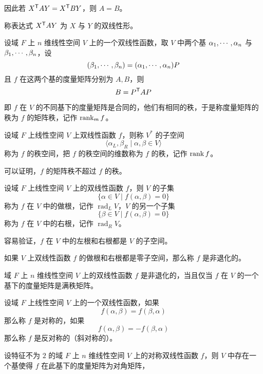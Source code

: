 因此若 ${X}^\mathsf{T}AY = {X}^\mathsf{T}BY$，则 $A = B$。

称表达式 ${X}^\mathsf{T}AY$ 为 $X$ 与 $Y$ 的双线性形。

\begin{theorem}
	设域 $F$ 上 $n$ 维线性空间 $V$ 上的一个双线性函数，取 $V$ 中两个基 $\alpha_1,\cdots,\alpha_n$ 与 $\beta_1,\cdots,\beta_n$，设
	\[ (\beta_1,\cdots,\beta_n) = (\alpha_1,\cdots,\alpha_n)P \]
	且 $f$ 在这两个基的度量矩阵分别为 $A,B$，则
	\[ B = {P}^\mathsf{T}AP \]
\end{theorem}

即 $f$ 在 $V$ 的不同基下的度量矩阵是合同的，他们有相同的秩，于是称度量矩阵的秩为 $f$ 的矩阵秩，记作 $\operatorname{rank}_m f$。

设域 $F$ 上线性空间 $V$ 上双线性函数 $f$，则称 $V^*$ 的子空间
\[ \langle \alpha_L,\beta_R \mid \alpha,\beta \in V \rangle \]
称为 $f$ 的秩空间，把 $f$ 的秩空间的维数称为 $f$ 的秩，记作 $\operatorname{rank} f$。

可以证明，$f$ 的矩阵秩不超过 $f$ 的秩。

\begin{definition}
	设域 $F$ 上线性空间 $V$ 上的双线性函数 $f$，则 $V$ 的子集
	\[ \{ \alpha \in V \mid f(\alpha,\beta) = 0 \} \]
	称为 $f$ 在 $V$ 中的做根，记作 $\operatorname{rad}_{L} V$，$V$ 的另一个子集
	\[ \{ \beta \in V \mid f(\alpha,\beta) = 0 \} \]
	称为 $f$ 在 $V$ 中的右根，记作 $\operatorname{rad}_{R} V$。
\end{definition}

容易验证，$f$ 在 $V$ 中的左根和右根都是 $V$ 的子空间。

\begin{definition}
	如果 $V$ 上双线性函数 $f$ 的做根和右根都是零子空间，那么称 $f$ 是非退化的。
\end{definition}

\begin{theorem}
	域 $F$ 上 $n$ 维线性空间 $V$ 上的双线性函数 $f$ 是非退化的，当且仅当 $f$ 在 $V$ 的一个基下的度量矩阵是满秩矩阵。
\end{theorem}

\begin{definition}
	设域 $F$ 上线性空间 $V$ 上的一个双线性函数，如果
	\[ f(\alpha,\beta) = f(\beta,\alpha) \]
	那么称 $f$ 是对称的，如果
	\[ f(\alpha,\beta) = -f(\beta,\alpha) \]
	那么称 $f$ 是反对称的（斜对称的）。
\end{definition}

\begin{theorem}
	设特征不为 $2$ 的域 $F$ 上 $n$ 维线性空间 $V$ 上的对称双线性函数 $f$，则 $V$ 中存在一个基使得 $f$ 在此基下的度量矩阵为对角矩阵，
\end{theorem}

